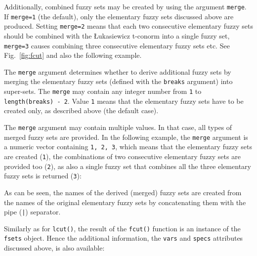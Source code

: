 \documentclass[review]{elsarticle}
\newcommand{\code}[1]{\texttt{#1}}
\begin{document}
Additionally, combined fuzzy sets may be created by using the argument \code{merge}. If \code{merge=1} (the default), only the elementary fuzzy sets discussed above are produced. 
Setting \code{merge=2} means that each two consecutive elementary fuzzy sets should be combined with the \L{}ukasiewicz t-conorm into a single fuzzy set, \code{merge=3} causes combining three consecutive elementary fuzzy sets etc. See Fig.~\ref{fig:fcut} and also the following example.


The \code{merge} argument determines whether to derive additional fuzzy sets by merging the elementary fuzzy sets (defined with the \code{breaks} argument) into super-sets. The \code{merge} may contain any integer number from \code{1} to \code{length(breaks) - 2}. Value \code{1} means that the elementary fuzzy sets have to be created only, as described above (the default case). 

%

%



The \code{merge} argument may contain multiple values. In that case, all types of merged fuzzy sets are provided. In the following example, the \code{merge} argument is a numeric vector containing \code{1, 2, 3}, which means that the elementary fuzzy sets are created (\code{1}), the combinations of two consecutive elementary fuzzy sets are provided too (\code{2}), as also a single fuzzy set that combines all the three elementary fuzzy sets is returned (\code{3}):
%

%
As can be seen, the names of the derived (merged) fuzzy sets are created from the names of the original elementary fuzzy sets by concatenating them with the pipe (\code{|}) separator. 

Similarly as for \code{lcut()}, the result of the \code{fcut()} function is an instance of the \code{fsets} object. Hence the additional information, the \code{vars} and \code{specs} attributes discussed above, is also available:
%

%







%
%
%
\end{document}
